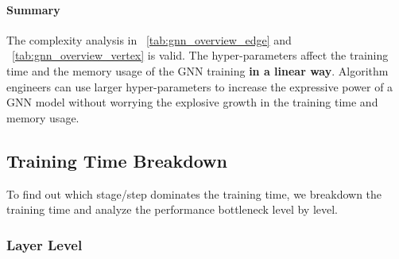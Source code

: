 \paragraph{Summary}

The complexity analysis in \tablename~\ref{tab:gnn_overview_edge} and \tablename~\ref{tab:gnn_overview_vertex} is valid.
The hyper-parameters affect the training time and the memory usage of the GNN training \textbf{in a linear way}.
Algorithm engineers can use larger hyper-parameters to increase the expressive power of a GNN model without worrying the explosive growth in the training time and memory usage.

\subsection{Training Time Breakdown}
\label{sec:training_time_breakdown}

To find out which stage/step dominates the training time, we breakdown the training time and analyze the performance bottleneck level by level.

\subsubsection{Layer Level}

